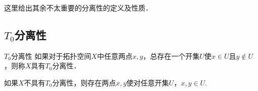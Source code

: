 
\begin{issues}
\issueDraft
\end{issues}

这里给出其余不太重要的分离性的定义及性质．

\subsection{$T_0$分离性}
\begin{definition}{$T_0$分离性}
如果对于拓扑空间$X$中任意两点$x,y$，总存在一个开集$U$使$x\in U$且$y\notin U$，则称$X$具有$T_0$分离性．
\end{definition}

如果$X$不具有$T_0$分离性，则存在两点$x,y$使对任意开集$U$，$x,y\in U$.




